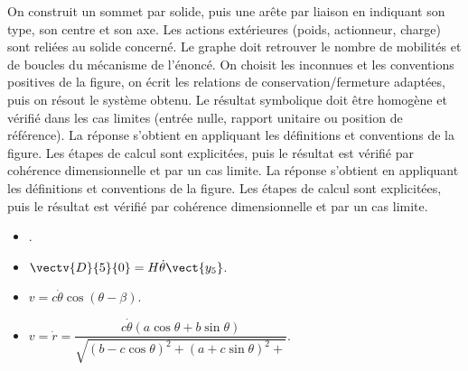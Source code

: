 \begin{corrigebox}
On construit un sommet par solide, puis une arête par liaison en
        indiquant son type, son centre et son axe. Les actions extérieures (poids,
        actionneur, charge) sont reliées au solide concerné. Le graphe doit retrouver le
        nombre de mobilités et de boucles du mécanisme de l'énoncé.
On choisit les inconnues et les conventions positives de la figure,
        on écrit les relations de conservation/fermeture adaptées, puis on résout le
        système obtenu. Le résultat symbolique doit être homogène et vérifié dans les cas
        limites (entrée nulle, rapport unitaire ou position de référence).
La réponse s'obtient en appliquant les définitions et conventions de la
    figure. Les étapes de calcul sont explicitées, puis le résultat est vérifié par
    cohérence dimensionnelle et par un cas limite.
La réponse s'obtient en appliquant les définitions et conventions de la
    figure. Les étapes de calcul sont explicitées, puis le résultat est vérifié par
    cohérence dimensionnelle et par un cas limite.
\begin{itemize}
\item .
\item $\vectv{D}{5}{0} =H\dot{\theta}\vect{y_5}$.
\item $v=c\dot{\theta}\cos\left(\theta-\beta \right)$.
\item $v=\dot{r}=\dfrac{c\dot{\theta}\left(a\cos\theta+b\sin\theta\right)}{\sqrt{\left(b-c\cos\theta \right)^2+\left(a+c\sin\theta \right)^2+}}$.
\end{itemize}
\end{corrigebox}
